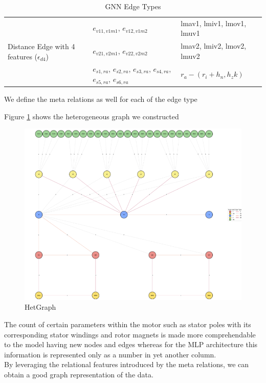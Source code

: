 \documentclass{report} %
\begin{document}
\begin{enumerate}
\begin{table}[H]
\begin{tabular}{|p{}|p{}|p{}|}
        \hline
        \multirow{3}{0.2\textwidth}{Distance Edge with 4 features (\( \epsilon_{d4} \))} & \( e_{v11, v1m1} \), \( e_{v12, v1m2} \) & lmav1, lmiv1, lmov1, lmuv1 \\
                                            &  \( e_{v21, v2m1} \), \( e_{v22, v2m2} \) & lmav2, lmiv2, lmov2, lmuv2 \\
                                            &  \( e_{s1, ra} \), \( e_{s2, ra} \), \( e_{s3, ra} \), \( e_{s4, ra} \), \( e_{s5, ra} \), \( e_{s6, ra} \)   &  \(r_a - (r_i + h_n, h_zk) \)\\

        \hline
        \end{tabular}
        \caption{\ac{GNN} Edge Types}
        \label{tab:GNN Edge Types}
    \end{table}

    We define the meta relations as well for each of the edge type

\end{enumerate}

Figure \ref{fig:HetGraph} shows the heterogeneous graph we constructed
\begin{figure}[H]
    \centering
    \includegraphics[width=1\textwidth]{./ReportImages/graph.png} 
    \caption{HetGraph}
    \label{fig:HetGraph}
\end{figure}
The count of certain parameters within the motor such as stator poles with its corresponding stator windings and rotor magnets is made more comprehendable to the model having new nodes and edges whereas for the \ac{MLP} architecture this information is represented only as a number in yet another column. \\
By leveraging the relational features introduced by the meta relations, we can obtain a good graph representation of the data.\\
\end{document}
